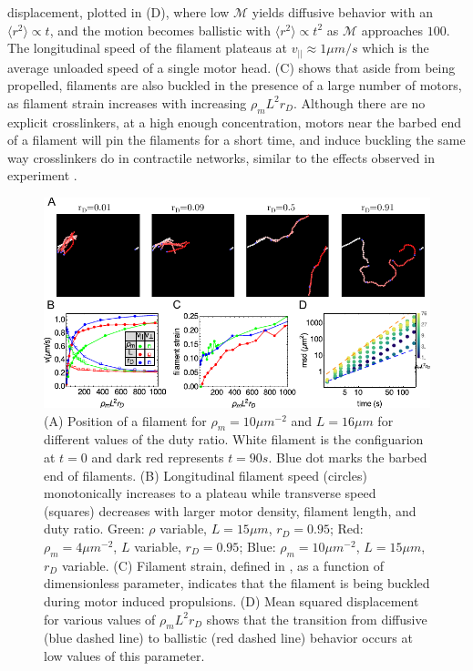 \documentclass[12pt]{article}
\begin{document}
displacement, plotted in (D), where low $\mathcal{M}$ 
yields diffusive behavior with an $\langle r^2 \rangle \propto t$, and the
motion becomes ballistic with $\langle r^2\rangle\propto t^2$ as $\mathcal{M}$ 
approaches $100$. The longitudinal speed of the filament plateaus at
$v_{||}\approx 1\mu m/s$ which is the average unloaded speed of a single motor 
head\cite{kron1986}. (C) shows that aside from being
propelled, filaments are also buckled in the presence of a large number of
motors, as filament strain increases with increasing $\rho_m L^2 r_D$.
Although there are no explicit crosslinkers, at a high enough concentration, 
motors near the barbed end of a filament will pin the filaments for a short 
time, and induce buckling the same way crosslinkers do in contractile networks, 
similar to the effects observed in experiment \cite{schaller2010}.
\begin{figure}[H] 
    \centering
    \includegraphics[scale=1.2]{figs/motility/mot_fig.pdf}
  \caption{%
  \label{fig:motility}%
  (A) Position of a filament for $\rho_m = 10\mu m^{-2}$ and $L = 16\mu m$ for
  different values of the duty ratio. White filament is the configuarion at
  $t=0$ and dark red represents $t=90s$. Blue dot marks the barbed end of
  filaments.  
  (B) Longitudinal filament speed (circles) monotonically increases to a plateau
  while transverse speed (squares) decreases with larger motor density, filament
  length, and duty ratio. Green: $\rho$ variable, $L=15\mu m$, $r_D=0.95$; Red:
  $\rho_m=4\mu m^{-2}$, $L$ variable, $r_D=0.95$; Blue: $\rho_m = 10\mu m^{-2}$,
  $L=15\mu m$, $r_D$ variable.  
  (C) Filament strain, defined in , as a function of
  dimensionless parameter, indicates that the filament is being buckled during 
  motor induced propulsions.
  (D) Mean squared displacement for various values of $\rho_m L^2 r_D$ shows
  that the transition from diffusive (blue dashed line) to ballistic (red dashed
  line) behavior occurs at low values of this parameter.     
 }
\end{figure}
\end{document}
